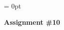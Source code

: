 \documentclass[addpoints,12pt]{exam}
\begin{document}
\headsep = 0pt

\sectionfont{\large}

\onehalfspace 

\vspace{0pt}


\pagestyle{headandfoot}

\pointsinrightmargin
\setlength{\rightpointsmargin}{0cm}
\marginpointname{ \points}

{\noindent}{\textbf{Assignment \#10}}\\
\end{document}
